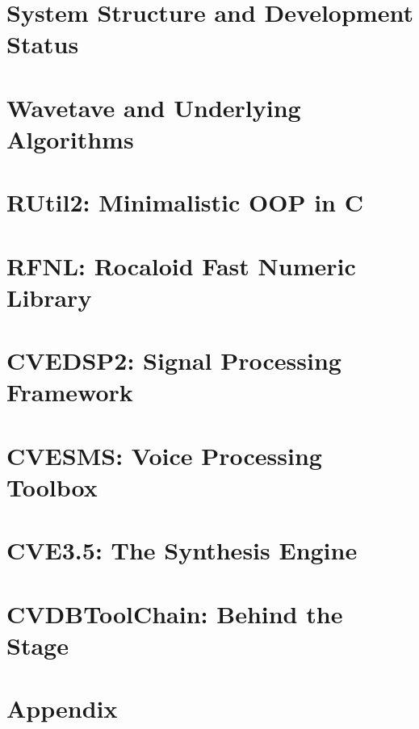 \chapter{System Structure and Development Status}



\chapter{Wavetave and Underlying Algorithms}

\chapter{RUtil2: Minimalistic OOP in C}

\chapter{RFNL: Rocaloid Fast Numeric Library}

\chapter{CVEDSP2: Signal Processing Framework}

\chapter{CVESMS: Voice Processing Toolbox}

\chapter{CVE3.5: The Synthesis Engine}

\chapter{CVDBToolChain: Behind the Stage}

\chapter{Appendix}

